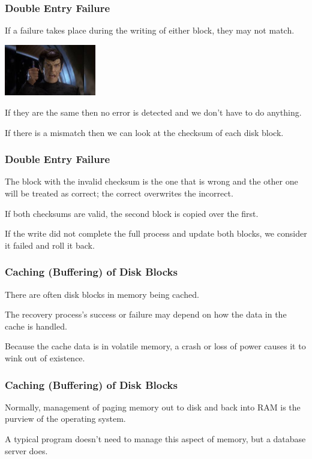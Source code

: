 \begin{frame}
\frametitle{Double Entry Failure}

If a failure takes place during the writing of either block, they may not match. 

\begin{center}
	\includegraphics[width=0.3\textwidth]{images/itsafake.jpg}
\end{center}

If they are the same then no error is detected and we don't have to do anything. 

If there is a mismatch then we can look at the checksum of each disk block. 

\end{frame}


\begin{frame}
\frametitle{Double Entry Failure}

The block with the invalid checksum is the one that is wrong and the other one will be treated as correct; the correct overwrites the incorrect. 

If both checksums are valid, the second block is copied over the first. 

If the write did not complete the full process and update both blocks, we consider it failed and roll it back.

\end{frame}

\begin{frame}
\frametitle{Caching (Buffering) of Disk Blocks}

There are often disk blocks in memory being cached. 

The recovery process's success or failure may depend on how the data in the cache is handled. 

Because the cache data is in volatile memory, a crash or loss of power causes it to wink out of existence. 

\end{frame}

\begin{frame}
\frametitle{Caching (Buffering) of Disk Blocks}

Normally, management of paging memory out to disk and back into RAM is the purview of the operating system. 

A typical program doesn't need to manage this aspect of memory, but a database server does.


\end{frame}


